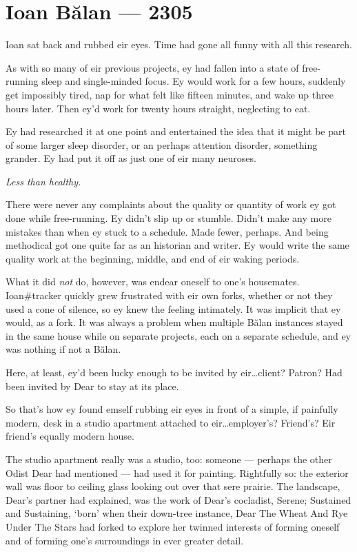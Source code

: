 \hypertarget{ioan-bux103lan-2305}{%
\chapter*{Ioan Bălan — 2305}\label{ioan-bux103lan-2305}}

Ioan sat back and rubbed eir eyes. Time had gone all funny with all this research.

As with so many of eir previous projects, ey had fallen into a state of free-running sleep and single-minded focus. Ey would work for a few hours, suddenly get impossibly tired, nap for what felt like fifteen minutes, and wake up three hours later. Then ey'd work for twenty hours straight, neglecting to eat.

Ey had researched it at one point and entertained the idea that it might be part of some larger sleep disorder, or an perhaps attention disorder, something grander. Ey had put it off as just one of eir many neuroses.

\emph{Less than healthy.}

There were never any complaints about the quality or quantity of work ey got done while free-running. Ey didn't slip up or stumble. Didn't make any more mistakes than when ey stuck to a schedule. Made fewer, perhaps. And being methodical got one quite far as an historian and writer. Ey would write the same quality work at the beginning, middle, and end of eir waking periods.

What it did \emph{not} do, however, was endear oneself to one's housemates. Ioan\#tracker quickly grew frustrated with eir own forks, whether or not they used a cone of silence, so ey knew the feeling intimately. It was implicit that ey would, as a fork. It was always a problem when multiple Bălan instances stayed in the same house while on separate projects, each on a separate schedule, and ey was nothing if not a Bălan.

Here, at least, ey'd been lucky enough to be invited by eir\ldots{}client? Patron? Had been invited by Dear to stay at its place.

So that's how ey found emself rubbing eir eyes in front of a simple, if painfully modern, desk in a studio apartment attached to eir\ldots{}employer's? Friend's? Eir friend's equally modern house.

The studio apartment really was a studio, too: someone — perhaps the other Odist Dear had mentioned — had used it for painting. Rightfully so: the exterior wall was floor to ceiling glass looking out over that sere prairie. The landscape, Dear's partner had explained, was the work of Dear's cocladist, Serene; Sustained and Sustaining, `born' when their down-tree instance, Dear The Wheat And Rye Under The Stars had forked to explore her twinned interests of forming oneself and of forming one's surroundings in ever greater detail.

